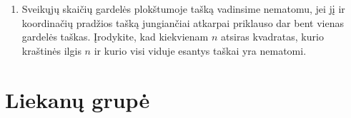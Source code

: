 \begin{enumerate}
  \item {} Sveikųjų skaičių gardelės plokštumoje
    tašką vadinsime nematomu, jei jį ir koordinačių pradžios tašką
    jungiančiai atkarpai priklauso dar bent vienas gardelės taškas.
    Įrodykite, kad kiekvienam $n$ atsiras kvadratas, kurio kraštinės ilgis
    $n$ ir kurio visi viduje esantys taškai yra nematomi. 
\end{enumerate}

\newpage
\section{Liekanų grupė} 

